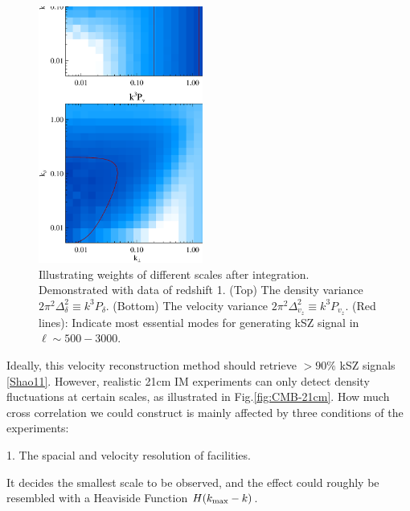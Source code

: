 \begin{figure}[tbp]
\begin{center}
\includegraphics[width=0.48\textwidth]{figure/k3pd_k3pv_z1.eps}
\end{center}
\vspace{-0.7cm}
\caption{
    Illustrating weights of different scales after integration. 
    Demonstrated with data of redshift 1.
    (Top) The density variance $2\pi^2\Delta_\delta^2\equiv k^3P_\delta$. 
    (Bottom) The velocity variance $2\pi^2\Delta_{v_z}^2\equiv k^3P_{v_z}$. 
    (Red lines): Indicate most essential modes for generating kSZ signal in 
    $\ell\sim 500-3000$.
}
\label{fig:k3v}
\end{figure}
Ideally, this velocity reconstruction method should 
retrieve $>90\%$ kSZ signals \ref{Shao11}. 
However, realistic 21cm IM experiments 
can only detect density fluctuations at certain scales, 
as illustrated in Fig.\ref{fig:CMB-21cm}. 
How much cross correlation we could construct is mainly affected 
by three conditions of the experiments:

1. The spacial and velocity resolution of facilities. 

It decides the smallest scale to be observed, 
and the effect could roughly be resembled with a Heaviside Function 
$H(k_\mathrm{max}-k)$. 


